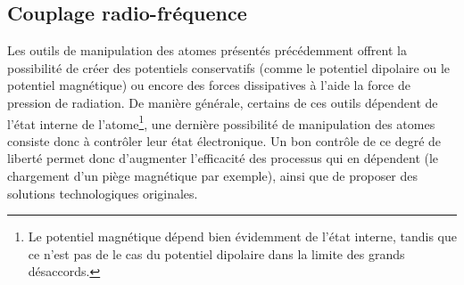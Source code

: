 \subsection{Couplage radio-fréquence} 
Les outils de manipulation des atomes présentés précédemment offrent la possibilité de créer des potentiels conservatifs (comme le potentiel dipolaire ou le potentiel magnétique) ou encore des forces dissipatives à l'aide la force de pression de radiation. De manière générale, certains de ces outils dépendent de l'état interne de l'atome\footnote{Le potentiel magnétique dépend bien évidemment de l'état interne, tandis que ce n'est pas de le cas du potentiel dipolaire dans la limite des grands désaccords.}, une dernière possibilité de manipulation des atomes consiste donc à contrôler leur état électronique. Un bon contrôle de ce degré de liberté permet donc d'augmenter l'efficacité des processus qui en dépendent (le chargement d'un piège magnétique par exemple), ainsi que de proposer des solutions technologiques originales. 

